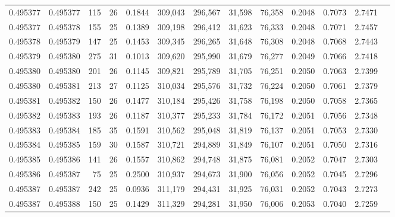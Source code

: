 \begin{tabular}{rrrrrrrrrrrrr}
0.495377 & 0.495377 & 115 &  26 &                                     0.1844 & 309,043 & 296,567 &  31,598 &  76,358 & 0.2048 & 0.7073 & 2.7471 \\
0.495377 & 0.495378 & 155 &  25 &                                     0.1389 & 309,198 & 296,412 &  31,623 &  76,333 & 0.2048 & 0.7071 & 2.7457 \\
0.495378 & 0.495379 & 147 &  25 &                                     0.1453 & 309,345 & 296,265 &  31,648 &  76,308 & 0.2048 & 0.7068 & 2.7443 \\
0.495379 & 0.495380 & 275 &  31 &                                     0.1013 & 309,620 & 295,990 &  31,679 &  76,277 & 0.2049 & 0.7066 & 2.7418 \\
0.495380 & 0.495380 & 201 &  26 &                                     0.1145 & 309,821 & 295,789 &  31,705 &  76,251 & 0.2050 & 0.7063 & 2.7399 \\
0.495380 & 0.495381 & 213 &  27 &                                     0.1125 & 310,034 & 295,576 &  31,732 &  76,224 & 0.2050 & 0.7061 & 2.7379 \\
0.495381 & 0.495382 & 150 &  26 &                                     0.1477 & 310,184 & 295,426 &  31,758 &  76,198 & 0.2050 & 0.7058 & 2.7365 \\
0.495382 & 0.495383 & 193 &  26 &                                     0.1187 & 310,377 & 295,233 &  31,784 &  76,172 & 0.2051 & 0.7056 & 2.7348 \\
0.495383 & 0.495384 & 185 &  35 &                                     0.1591 & 310,562 & 295,048 &  31,819 &  76,137 & 0.2051 & 0.7053 & 2.7330 \\
0.495384 & 0.495385 & 159 &  30 &                                     0.1587 & 310,721 & 294,889 &  31,849 &  76,107 & 0.2051 & 0.7050 & 2.7316 \\
0.495385 & 0.495386 & 141 &  26 &                                     0.1557 & 310,862 & 294,748 &  31,875 &  76,081 & 0.2052 & 0.7047 & 2.7303 \\
0.495386 & 0.495387 &  75 &  25 &                                     0.2500 & 310,937 & 294,673 &  31,900 &  76,056 & 0.2052 & 0.7045 & 2.7296 \\
0.495387 & 0.495387 & 242 &  25 &                                     0.0936 & 311,179 & 294,431 &  31,925 &  76,031 & 0.2052 & 0.7043 & 2.7273 \\
0.495387 & 0.495388 & 150 &  25 &                                     0.1429 & 311,329 & 294,281 &  31,950 &  76,006 & 0.2053 & 0.7040 & 2.7259 \\

\end{tabular}
